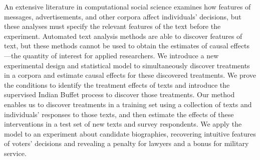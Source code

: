 An extensive literature in computational social science examines how features of messages, advertisements, and other corpora affect individuals' decisions, but these analyses must specify the relevant features of the text before the experiment.  Automated text analysis methods are able to discover features of text, but these methods cannot be used to obtain the estimates of causal effects---the quantity of interest for applied researchers.  We introduce a new experimental design and statistical model to simultaneously discover treatments in a corpora and estimate causal effects for these discovered treatments.  We prove the conditions to identify the treatment effects of texts and introduce the supervised Indian Buffet process to discover those treatments.  Our method enables us to discover treatments in a training set using a collection of texts and individuals' responses to those texts, and then estimate the effects of these interventions in a test set of new texts and survey respondents. We apply the model to an experiment about candidate biographies, recovering intuitive features of voters' decisions and revealing a penalty for lawyers and a bonus for military service.
